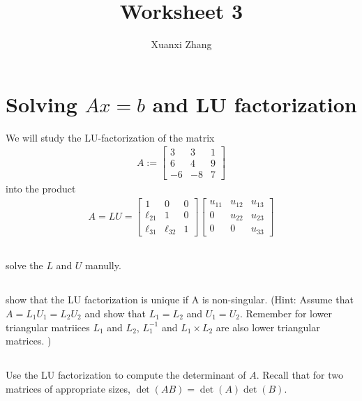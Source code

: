 \documentclass{article}%
\title{\huge Worksheet 3\\
\normalsize}
\author{Xuanxi Zhang}
\begin{document}
\maketitle



\section{Solving $Ax=b$ and LU factorization}
We will study the LU-factorization of the matrix
\begin{align*}
    A:=
  \begin{bmatrix}
    3  &   3   &    1\\
    6  &   4   &  9\\
    -6 &  -8   &   7
  \end{bmatrix}
\end{align*}
into the product
\begin{align*}
A = LU =
\begin{bmatrix}
1 & 0 & 0 \\
    \ell_{21} & 1 & 0\\
    \ell_{31} & \ell_{32} & 1
\end{bmatrix}
\begin{bmatrix}
    u_{11} & u_{12} & u_{13} \\
    0 & u_{22} & u_{23}\\
    0 & 0 & u_{33}
\end{bmatrix}
\end{align*}

\subsection{}
solve the $L$ and $U$ manully.

\subsection{}
show that the LU factorization is unique if A is non-singular. (Hint: Assume that $A=L_1U_1=L_2U_2$ and show that $L_1=L_2$ and $U_1=U_2$. Remember for lower  triangular matriices $L_1$ and $L_2$, $L_1^{-1}$  and $L_1\times L_2$ are also lower triangular matrices. )

\subsection{}\label{sec:3.1d}
Use the LU factorization to compute the determinant of
$A$. Recall that for two matrices of appropriate sizes,
$\det(AB)=\det(A)\det(B)$.
\end{document}
